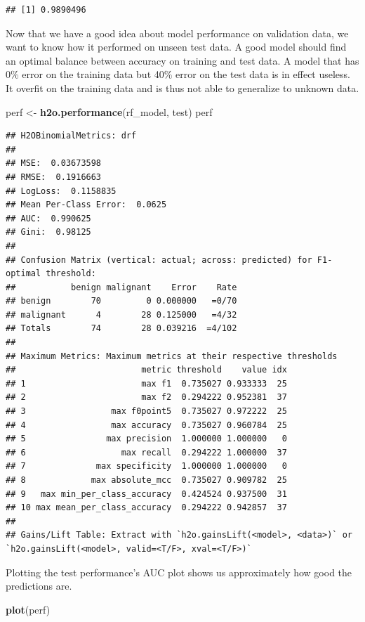 \documentclass[]{article}
\newenvironment{Shaded}{\begin{snugshade}}{\end{snugshade}}
\newcommand{\KeywordTok}[1]{\textcolor[rgb]{0.13,0.29,0.53}{\textbf{{#1}}}}
\newcommand{\StringTok}[1]{\textcolor[rgb]{0.31,0.60,0.02}{{#1}}}
\newcommand{\NormalTok}[1]{{#1}}
\begin{document}
\begin{verbatim}
## [1] 0.9890496
\end{verbatim}

Now that we have a good idea about model performance on validation data,
we want to know how it performed on unseen test data. A good model
should find an optimal balance between accuracy on training and test
data. A model that has 0\% error on the training data but 40\% error on
the test data is in effect useless. It overfit on the training data and
is thus not able to generalize to unknown data.

\begin{Shaded}
\begin{Highlighting}[]
\NormalTok{perf <-}\StringTok{ }\KeywordTok{h2o.performance}\NormalTok{(rf_model, test)}
\NormalTok{perf}
\end{Highlighting}
\end{Shaded}

\begin{verbatim}
## H2OBinomialMetrics: drf
## 
## MSE:  0.03673598
## RMSE:  0.1916663
## LogLoss:  0.1158835
## Mean Per-Class Error:  0.0625
## AUC:  0.990625
## Gini:  0.98125
## 
## Confusion Matrix (vertical: actual; across: predicted) for F1-optimal threshold:
##           benign malignant    Error    Rate
## benign        70         0 0.000000   =0/70
## malignant      4        28 0.125000   =4/32
## Totals        74        28 0.039216  =4/102
## 
## Maximum Metrics: Maximum metrics at their respective thresholds
##                         metric threshold    value idx
## 1                       max f1  0.735027 0.933333  25
## 2                       max f2  0.294222 0.952381  37
## 3                 max f0point5  0.735027 0.972222  25
## 4                 max accuracy  0.735027 0.960784  25
## 5                max precision  1.000000 1.000000   0
## 6                   max recall  0.294222 1.000000  37
## 7              max specificity  1.000000 1.000000   0
## 8             max absolute_mcc  0.735027 0.909782  25
## 9   max min_per_class_accuracy  0.424524 0.937500  31
## 10 max mean_per_class_accuracy  0.294222 0.942857  37
## 
## Gains/Lift Table: Extract with `h2o.gainsLift(<model>, <data>)` or `h2o.gainsLift(<model>, valid=<T/F>, xval=<T/F>)`
\end{verbatim}

Plotting the test performance's AUC plot shows us approximately how good
the predictions are.

\begin{Shaded}
\begin{Highlighting}[]
\KeywordTok{plot}\NormalTok{(perf)}
\end{Highlighting}
\end{Shaded}
\end{document}
